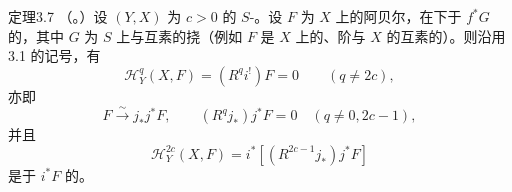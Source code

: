 \begin{SGAresult}{定理}{3.7}
（。）设 $(Y,X)$ 为 $c>0$ 的 $S$-。设 $F$ 为 $X$ 上的阿贝尔，在下于 $f^*G$ 的，其中 $G$ 为 $S$ 上与互素的挠（例如 $F$ 是 $X$ 上的、阶与 $X$ 的互素的）。则沿用 3.1 的记号，有
\[
\mathcal H_Y^q(X,F)=(R^qi^!)F=0\qquad(q\ne2c),
\]
亦即
\[
F\xrightarrow{\sim}j_*j^*F,\qquad (R^qj_*)j^*F=0\quad(q\ne0,2c-1),
\]
并且
\[
\mathcal H_Y^{2c}(X,F)=i^*[(R^{2c-1}j_*)j^*F]
\]
是于 $i^*F$ 的。
\end{SGAresult}

